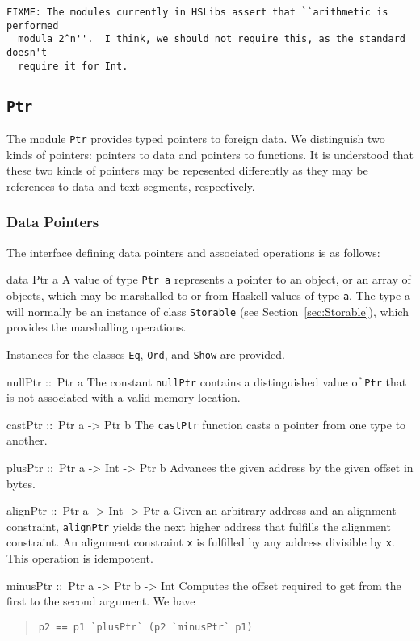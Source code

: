 \documentclass[a4paper,twosides]{article}
\makeatletter
\newcommand{\code}[1]{\texttt{#1}}      %
\newenvironment{codedesc}{%
  \list{}{\labelwidth\z@
    \let\makelabel\codedesclabel}
  }{%
  \endlist
  }
\newcommand*{\codedesclabel}[1]{%
  \hspace{-\leftmargin}
  \parbox[b]{\labelwidth}{\makebox[0pt][l]{\code{#1}}\\}\hfil\relax
  }
\makeatother
\begin{document}
\begin{verbatim}
FIXME: The modules currently in HSLibs assert that ``arithmetic is performed
  modula 2^n''.  I think, we should not require this, as the standard doesn't
  require it for Int.
\end{verbatim}

\subsection{\code{Ptr}}
\label{sec:Ptr}

The module \code{Ptr} provides typed pointers to foreign data.  We distinguish
two kinds of pointers: pointers to data and pointers to functions.  It is
understood that these two kinds of pointers may be repesented differently as
they may be references to data and text segments, respectively.

\subsubsection{Data Pointers}

The interface defining data pointers and associated operations is as follows:
%
\begin{codedesc}
\item[data Ptr a] A value of type \code{Ptr a} represents a pointer to an
  object, or an array of objects, which may be marshalled to or from Haskell
  values of type \code{a}.  The type a will normally be an instance of class
  \code{Storable} (see Section~\ref{sec:Storable}), which provides the
  marshalling operations.

  Instances for the classes \code{Eq}, \code{Ord}, and \code{Show} are
  provided. 
\item[nullPtr ::\ Ptr a] The constant \code{nullPtr} contains a distinguished
  value of \code{Ptr} that is not associated with a valid memory location.
\item[castPtr ::\ Ptr a -> Ptr b] The \code{castPtr} function casts a pointer
  from one type to another.
\item[plusPtr ::\ Ptr a -> Int -> Ptr b] Advances the given address by the
  given offset in bytes.
\item[alignPtr ::\ Ptr a -> Int -> Ptr a] Given an arbitrary address and an
  alignment constraint, \code{alignPtr} yields the next higher address that
  fulfills the alignment constraint. An alignment constraint \code{x} is
  fulfilled by any address divisible by \code{x}. This operation is
  idempotent.
\item[minusPtr ::\ Ptr a -> Ptr b -> Int] Computes the offset required to get
  from the first to the second argument.  We have
  \begin{quote}
\begin{verbatim}
p2 == p1 `plusPtr` (p2 `minusPtr` p1)
\end{verbatim}
  \end{quote}
\end{codedesc}
\end{document}
